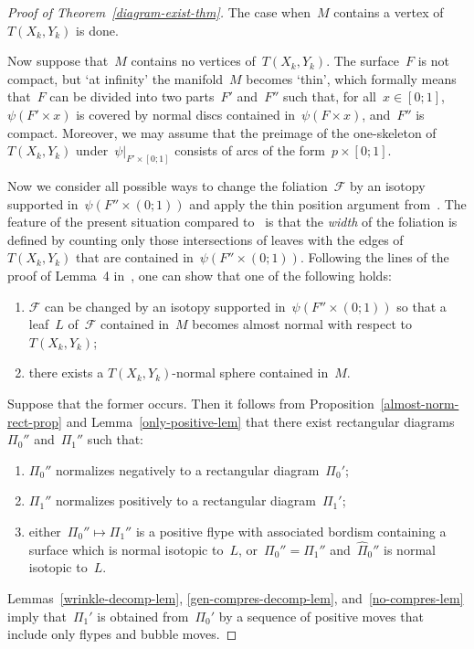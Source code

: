 \documentclass{amsart}
\theoremstyle{theorem}
\theoremstyle{remark}
\theoremstyle{definition}
\numberwithin{equation}{section}
\numberwithin{figure}{section}
\begin{document}
\begin{proof}[Proof of Theorem~\ref{diagram-exist-thm}]
The case when~$M$ contains a vertex of~$T(X_k,Y_k)$ is done.

Now suppose that~$M$ contains no vertices of~$T(X_k,Y_k)$.
The surface~$F$ is not compact, but `at infinity' the manifold~$M$ becomes `thin', which formally means that~$F$
can be divided into two parts~$F'$ and~$F''$ such that, for all~$x\in[0;1]$, $\psi(F'\times x)$ is covered by normal discs contained in~$\psi(F\times x)$, and~$F''$
is compact. Moreover, we may assume that the preimage of the one-skeleton of~$T(X_k,Y_k)$ under~$\psi|_{F'\times[0;1]}$
consists of arcs of the form~$p\times[0;1]$.

Now we consider all possible ways to change the foliation~$\mathscr F$ by an isotopy supported
in~$\psi(F''\times(0;1))$ and apply the thin position argument from~\cite{gabai-87,thompson}.
The feature of the present situation compared to~\cite{gabai-87,thompson} is that
the \emph{width} of the foliation is defined by counting only those intersections of leaves
with the edges of~$T(X_k,Y_k)$ that are contained in~$\psi(F''\times(0;1))$.
Following the lines of the proof of Lemma~4 in~\cite{thompson}, one can show that one of the following
holds:
\begin{enumerate}
\item
$\mathscr F$ can be changed by an isotopy supported in~$\psi(F''\times(0;1))$ so that
a leaf~$L$ of~$\mathscr F$ contained in~$M$ becomes almost normal with respect to~$T(X_k,Y_k)$;
\item
there exists a $T(X_k,Y_k)$-normal sphere contained in~$M$.
\end{enumerate}

Suppose that the former occurs. Then it follows from Proposition~\ref{almost-norm-rect-prop}
and Lemma~\ref{only-positive-lem}
that there exist rectangular diagrams~$\Pi_0''$ and~$\Pi_1''$ such that:
\begin{enumerate}
\item
$\Pi_0''$ normalizes negatively to a rectangular diagram~$\Pi_0'$;
\item
$\Pi_1''$ normalizes positively to a rectangular diagram~$\Pi_1'$;
\item
either~$\Pi_0''\mapsto\Pi_1''$ is a positive flype with associated bordism containing a surface
which is normal isotopic to~$L$, or~$\Pi_0''=\Pi_1''$ and~$\widehat\Pi_0''$ is normal isotopic to~$L$.
\end{enumerate}
Lemmas~\ref{wrinkle-decomp-lem}, \ref{gen-compres-decomp-lem}, and~\ref{no-compres-lem}
imply that~$\Pi_1'$ is obtained from~$\Pi_0'$ by a sequence of positive
moves that include only flypes and bubble moves.


\end{proof}
\end{document}

